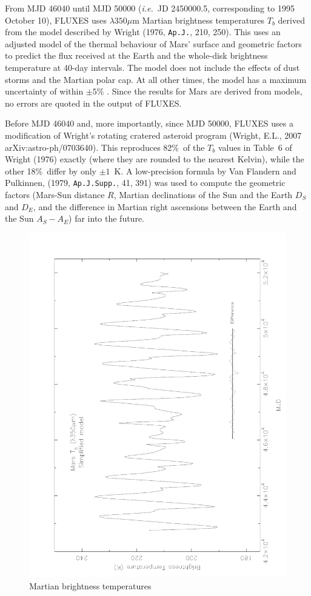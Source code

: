 \documentclass[11pt,twoside]{article}
\renewcommand{\_}{\texttt{\symbol{95}}}
\begin{document}
From MJD 46040 until MJD 50000 ({\em{i.e.}}\ JD 2450000.5, corresponding to 1995
October 10), FLUXES uses $\lambda350\mu$m Martian brightness temperatures
$T_b$ derived from the model described by Wright (1976, {\tt{Ap.J.}}, 210, 250).
This uses an adjusted model of the thermal
behaviour of Mars' surface and geometric factors to predict the flux received at
the Earth and the whole-disk brightness temperature at 40-day intervals. The
model does not include the effects of dust storms and the Martian polar cap. At
all other times, the model has a maximum uncertainty of within $\pm5$\% . Since
the results for Mars are derived from models, no errors are quoted in the output
of FLUXES.

Before MJD 46040 and, more importantly, since MJD 50000, FLUXES uses a
modification of Wright's rotating cratered asteroid program (Wright,
E.L., 2007 arXiv:astro-ph/0703640). This reproduces
82\%\ of the $T_b$ values in Table~6 of Wright (1976) exactly (where they are
rounded to the nearest Kelvin), while the other 18\%\ differ by only $\pm1$~K.
A low-precision formula by Van Flandern and Pulkinnen,
(1979, {\tt{Ap.J.Supp.}}, 41, 391)
was used to compute the geometric factors (Mars-Sun
distance $R$, Martian declinations of the Sun and the Earth $D_S$ and $D_E$,
and the difference in Martian right ascensions between the Earth and the Sun
$A_S - A_E$) far into the future.

\begin{figure}
\includegraphics[angle=-90,width=\textwidth]{sun213_fig1}
\vspace*{-0.5cm}
\caption{Martian brightness temperatures}
\label{fig:mars}
\end{figure}
\end{document}
